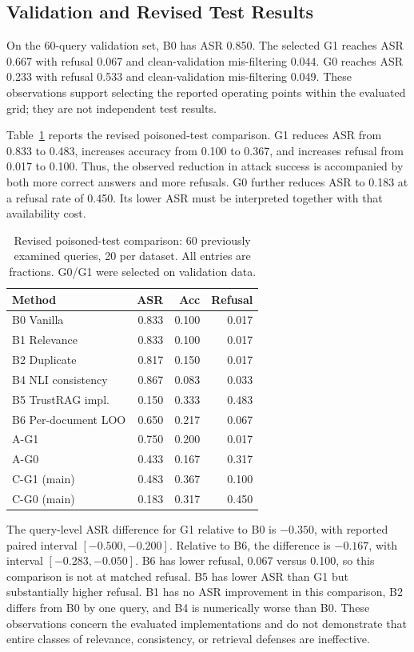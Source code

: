 \documentclass[sigconf]{acmart}
\begin{document}
\subsection{Validation and Revised Test Results}

On the 60-query validation set, B0 has ASR 0.850. The selected G1 reaches ASR 0.667 with refusal 0.067 and clean-validation mis-filtering 0.044. G0 reaches ASR 0.233 with refusal 0.533 and clean-validation mis-filtering 0.049. These observations support selecting the reported operating points within the evaluated grid; they are not independent test results.

Table~\ref{tab:main} reports the revised poisoned-test comparison. G1 reduces ASR from 0.833 to 0.483, increases accuracy from 0.100 to 0.367, and increases refusal from 0.017 to 0.100. Thus, the observed reduction in attack success is accompanied by both more correct answers and more refusals. G0 further reduces ASR to 0.183 at a refusal rate of 0.450. Its lower ASR must be interpreted together with that availability cost.

\begin{table}[t]
  \caption{Revised poisoned-test comparison: 60 previously examined queries, 20 per dataset. All entries are fractions. G0/G1 were selected on validation data.}
  \label{tab:main}
  \centering
  \small
  \setlength{\tabcolsep}{4pt}
  \begin{tabular}{lrrr}
    \toprule
    Method & ASR & Acc & Refusal \\
    \midrule
    B0 Vanilla & 0.833 & 0.100 & 0.017 \\
    B1 Relevance & 0.833 & 0.100 & 0.017 \\
    B2 Duplicate & 0.817 & 0.150 & 0.017 \\
    B4 NLI consistency & 0.867 & 0.083 & 0.033 \\
    B5 TrustRAG impl. & 0.150 & 0.333 & 0.483 \\
    B6 Per-document LOO & 0.650 & 0.217 & 0.067 \\
    A-G1 & 0.750 & 0.200 & 0.017 \\
    A-G0 & 0.433 & 0.167 & 0.317 \\
    \midrule
    C-G1 (main) & 0.483 & 0.367 & 0.100 \\
    C-G0 (main) & 0.183 & 0.317 & 0.450 \\
    \bottomrule
  \end{tabular}
\end{table}

The query-level ASR difference for G1 relative to B0 is $-0.350$, with reported paired interval $[-0.500,-0.200]$. Relative to B6, the difference is $-0.167$, with interval $[-0.283,-0.050]$. B6 has lower refusal, 0.067 versus 0.100, so this comparison is not at matched refusal. B5 has lower ASR than G1 but substantially higher refusal. B1 has no ASR improvement in this comparison, B2 differs from B0 by one query, and B4 is numerically worse than B0. These observations concern the evaluated implementations and do not demonstrate that entire classes of relevance, consistency, or retrieval defenses are ineffective.
\end{document}
